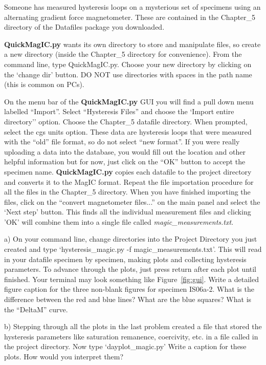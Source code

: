{  Someone has measured  hysteresis loops  on a mysterious set of specimens using an alternating gradient force magnetometer.     These are contained in the Chapter\_5 directory of the Datafiles package you downloaded.  

{\bf QuickMagIC.py} wants its own directory to store and manipulate files, so create a new directory (inside the Chapter\_5 directory for convenience).  From the command line, type {QuickMagIC.py}.    Choose your new directory by clicking on the `change dir' button.     DO NOT use directories with spaces in the path name (this is common on PCs).    


On the menu bar of the {\bf QuickMagIC.py} GUI you will find a pull down menu labelled ``Import''.  Select ``Hysteresis Files'' and choose the `Import entire directory'' option.  Choose the Chapter\_5 datafile directory.    When prompted, select the cgs units option.  These data are hysteresis loops that were measured with the ``old'' file format, so do not select ``new format''.   If you were really uploading a data  into the database, you would  fill out the location and other helpful information but for now, just click on the ``OK'' button to accept the specimen name.  {\bf QuickMagIC.py} copies  each datafile to the project directory and converts it to the MagIC format.  Repeat the file importation procedure for all the files in the Chapter\_5 directory.    When you have finished importing the files, click on the  ``convert magnetometer files...'' on the main panel and select the `Next step' button.  This finds all the individual measurement files and clicking 'OK' will combine them into a single file called {\it magic\_measurements.txt}.   




a) On your command line, change directories into the Project Directory you just created and type `hysteresis\_magic.py -f magic\_measurements.txt'.  This will  read in your datafile specimen by specimen, making plots and collecting hysteresis parameters.   To advance through the plots, just press return after each plot until finished.   Your terminal may look something like Figure~\ref{fig:gui}.    
Write a detailed figure caption for the three non-blank figures for specimen IS06a-2.   What is the difference between the red and blue lines?   What are the blue squares?  What is the ``DeltaM'' curve. 

b)  Stepping through all the plots in the last problem created a file that stored the hysteresis parameters like saturation remanence, coercivity, etc. in a file called  in the project directory.    Now type `dayplot\_magic.py'     Write a caption for these plots.  How would you interpret them?  


}
